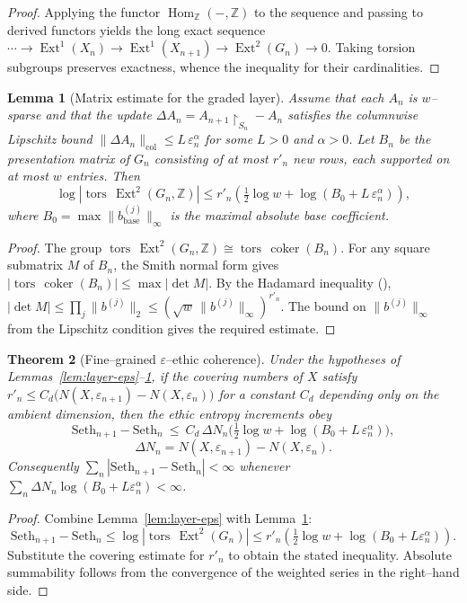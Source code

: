 \documentclass[12pt]{article}
\newcommand{\tors}{\operatorname{tors}}
\DeclareMathOperator{\coker}{coker}
\newcommand{\ZZ}{\mathbb{Z}}
\newcommand{\Hom}{\operatorname{Hom}}
\newcommand{\Ext}{\operatorname{Ext}}
\theoremstyle{plain}
\newtheorem{theorem}{Theorem}[section]
\newtheorem{lemma}[theorem]{Lemma}
\theoremstyle{definition}
\theoremstyle{remark}
\numberwithin{equation}{section}
\begin{document}
\begin{proof}
Applying the functor $\Hom_\ZZ(-,\ZZ)$ to the sequence and passing to derived functors
yields the long exact sequence
\(
\cdots\to\Ext^1(X_n)\to\Ext^1(X_{n+1})\to\Ext^2(G_n)\to0
\).
Taking torsion subgroups preserves exactness, whence the inequality
for their cardinalities.
\end{proof}

\begin{lemma}[Matrix estimate for the graded layer]\label{lem:layer-det}
Assume that each $A_n$ is $w$–sparse and that the update
$\Delta A_n=A_{n+1}\!\restriction_{S_n}-A_n$
satisfies the columnwise Lipschitz bound
$\|\Delta A_n\|_{\mathrm{col}}\le L\,\varepsilon_n^\alpha$ for some
$L>0$ and $\alpha>0$.
Let $B_n$ be the presentation matrix of $G_n$ consisting of at most
$r'_n$ new rows, each supported on at most $w$ entries.
Then
\[
\log|\tors\,\Ext^2(G_n,\ZZ)|
 \le r'_n\!\left(\tfrac12\log w+\log(B_0+L\,\varepsilon_n^\alpha)\right),
\]
where $B_0=\max\|b^{(j)}_{\mathrm{base}}\|_\infty$ is the maximal absolute base coefficient.
\end{lemma}

\begin{proof}
The group $\tors\,\Ext^2(G_n,\ZZ)\cong \tors\,\coker(B_n)$.
For any square submatrix $M$ of $B_n$, the Smith normal form gives
\(|\tors\,\coker(B_n)|\le \max|\det M|\).
By the Hadamard inequality (\cite{HornJohnson1990}),
\(|\det M|\le \prod_j\|b^{(j)}\|_2\le(\sqrt w\,\|b^{(j)}\|_\infty)^{r'_n}\).
The bound on $\|b^{(j)}\|_\infty$ from the Lipschitz condition
gives the required estimate.
\end{proof}

\begin{theorem}[Fine–grained $\varepsilon$–ethic coherence]\label{th:eps-fine}
Under the hypotheses of Lemmas~\ref{lem:layer-eps}–\ref{lem:layer-det},
if the covering numbers of $X$ satisfy
$r'_n\le C_d\!\big(N(X,\varepsilon_{n+1})-N(X,\varepsilon_n)\big)$
for a constant $C_d$ depending only on the ambient dimension,
then the ethic entropy increments obey
\[
\mathrm{Seth}_{n+1}-\mathrm{Seth}_{n}
\ \le\
C_d\,\Delta N_n
\Big(\tfrac12\log w+\log(B_0+L\,\varepsilon_n^\alpha)\Big),
\]
\[
\Delta N_n=N(X,\varepsilon_{n+1})-N(X,\varepsilon_n).
\]
Consequently $\sum_n|\mathrm{Seth}_{n+1}-\mathrm{Seth}_n|<\infty$ whenever
$\sum_n \Delta N_n\log(B_0+L\varepsilon_n^\alpha)<\infty$.
\end{theorem}

\begin{proof}
Combine Lemma~\ref{lem:layer-eps} with Lemma~\ref{lem:layer-det}:
\[
\mathrm{Seth}_{n+1}-\mathrm{Seth}_{n}
 \le \log|\tors\,\Ext^2(G_n)|
 \le r'_n\!\left(\tfrac12\log w+\log(B_0+L\varepsilon_n^\alpha)\right).
\]
Substitute the covering estimate for $r'_n$ to obtain the stated inequality.
Absolute summability follows from the convergence of the weighted series
in the right–hand side.
\end{proof}
\end{document}
